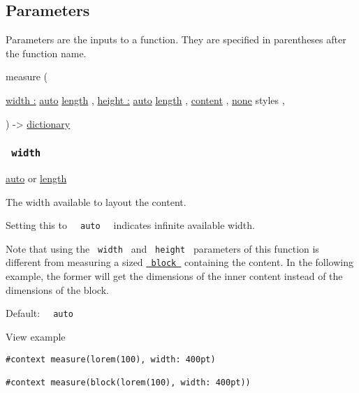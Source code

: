 \subsection{\texorpdfstring{{ Parameters
}}{ Parameters }}\label{parameters}

\label{parameters-tooltip}
Parameters are the inputs to a function. They are specified in
parentheses after the function name.

{ measure } (

{ \hyperref[parameters-width]{width :}
\href{/docs/reference/foundations/auto/}{auto}
\href{/docs/reference/layout/length/}{length} , } {
\hyperref[parameters-height]{height :}
\href{/docs/reference/foundations/auto/}{auto}
\href{/docs/reference/layout/length/}{length} , } {
\href{/docs/reference/foundations/content/}{content} , } {
\href{/docs/reference/foundations/none/}{none} { styles } , }

) -\textgreater{}
\href{/docs/reference/foundations/dictionary/}{dictionary}

\subsubsection{\texorpdfstring{\texttt{\ width\ }}{ width }}\label{parameters-width}

\href{/docs/reference/foundations/auto/}{auto} {or}
\href{/docs/reference/layout/length/}{length}

The width available to layout the content.

Setting this to \texttt{\ }{\texttt{\ auto\ }}\texttt{\ } indicates
infinite available width.

Note that using the \texttt{\ width\ } and \texttt{\ height\ }
parameters of this function is different from measuring a sized
\href{/docs/reference/layout/block/}{\texttt{\ block\ }} containing the
content. In the following example, the former will get the dimensions of
the inner content instead of the dimensions of the block.

Default: \texttt{\ }{\texttt{\ auto\ }}\texttt{\ }


View example

\begin{verbatim}
#context measure(lorem(100), width: 400pt)

#context measure(block(lorem(100), width: 400pt))
\end{verbatim}

